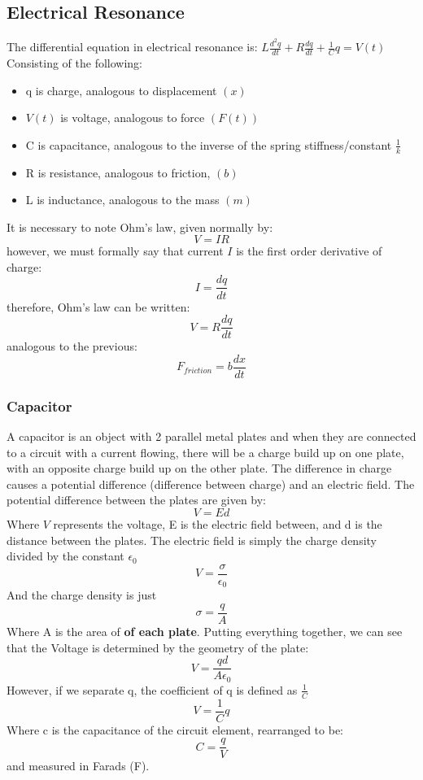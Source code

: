 \documentclass[10pt]{report}
\begin{document}
{\subsection{Electrical Resonance}
\par{The differential equation in electrical resonance is: $L\frac{d^{2}q}{dt}+R\frac{dq}{dt}+\frac{1}{C}q=V\left(t\right)$ Consisting of the following: 
\begin{itemize}
	\item{q is charge, analogous to displacement $\left(x\right)$}
	\item{$V\left(t\right)$ is voltage, analogous to force $\left(F\left(t\right)\right)$}
	\item{C is capacitance, analogous to the inverse of the spring stiffness/constant $\frac{1}{k}$}
	\item{R is resistance, analogous to friction, $\left(b\right)$}
	\item{L is inductance, analogous to the mass $\left(m\right)$}
\end{itemize}
It is necessary to note Ohm's law, given normally by: \[
V=IR
\] however, we must formally say that current $I$ is the first order derivative of charge: \[
I=\frac{dq}{dt}
\] therefore, Ohm's law can be written: \[
V=R\frac{dq}{dt}
\]analogous to the previous: \[
F_{friction}=b\frac{dx}{dt}
\] 
}
\subsubsection{Capacitor}
\par{A capacitor is an object with 2 parallel metal plates and when they are connected to a circuit with a current flowing, there will be a charge build up on one plate, with an opposite charge build up on the other plate. The difference in charge causes a potential difference (difference between charge) and an electric field. The potential difference between the plates are given by: \[
V=Ed
\] Where $V$ represents the voltage, E is the electric field between, and d is the distance between the plates. The electric field is simply the charge density divided by the constant $\epsilon_{0}$ \[
V=\frac{\sigma}{\epsilon_{0}}
\] And the charge density is just \[
\sigma=\frac{q}{A}
\] Where A is the area of \textbf{of each plate}. Putting everything together, we can see that the Voltage is determined by the geometry of the plate: \[
V=\frac{qd}{A\epsilon_{0}}
\] However, if we separate q, the coefficient of q is defined as $\frac{1}{C}$  \[
V=\frac{1}{C}q
\]  Where c is the capacitance of the circuit element, rearranged to be: \[
C=\frac{q}{V}
\] and measured in Farads (F).}
}
\end{document}
